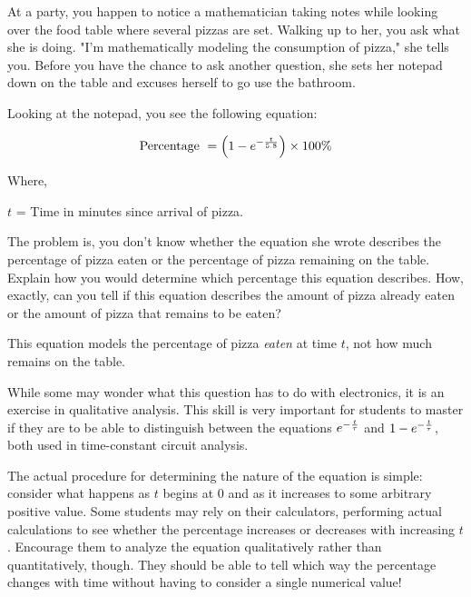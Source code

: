 

At a party, you happen to notice a mathematician taking notes while looking over the food table where several pizzas are set.  Walking up to her, you ask what she is doing.  "I'm mathematically modeling the consumption of pizza," she tells you.  Before you have the chance to ask another question, she sets her notepad down on the table and excuses herself to go use the bathroom.

Looking at the notepad, you see the following equation:

$$\hbox{Percentage } = \left(1 - e^{-{t \over 5.8}}\right) \times 100\%$$

\noindent
Where,

$t$ = Time in minutes since arrival of pizza.

\vskip 10pt

The problem is, you don't know whether the equation she wrote describes the percentage of pizza eaten or the percentage of pizza remaining on the table.  Explain how you would determine which percentage this equation describes.  How, exactly, can you tell if this equation describes the amount of pizza already eaten or the amount of pizza that remains to be eaten?







This equation models the percentage of pizza {\it eaten} at time $t$, not how much remains on the table.







While some may wonder what this question has to do with electronics, it is an exercise in qualitative analysis.  This skill is very important for students to master if they are to be able to distinguish between the equations $e^{-{t \over \tau}}$ and $1 - e^{-{t \over \tau}}$, both used in time-constant circuit analysis.

The actual procedure for determining the nature of the equation is simple: consider what happens as $t$ begins at 0 and as it increases to some arbitrary positive value.  Some students may rely on their calculators, performing actual calculations to see whether the percentage increases or decreases with increasing $t$.  Encourage them to analyze the equation qualitatively rather than quantitatively, though.  They should be able to tell which way the percentage changes with time without having to consider a single numerical value!




